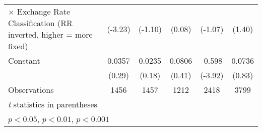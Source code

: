 {\begin{tabular}{l*{5}{c}}
$\times$ Exchange Rate Classification (RR inverted, higher = more fixed)&  (-3.23)         &  (-1.10)         &   (0.08)         &  (-1.07)         &   (1.40)         \\
\addlinespace
Constant        &   0.0357         &   0.0235         &   0.0806         &   -0.598\sym{***}&   0.0736         \\
                &   (0.29)         &   (0.18)         &   (0.41)         &  (-3.92)         &   (0.83)         \\
\midrule
Observations    &     1456         &     1457         &     1212         &     2418         &     3799         \\
\bottomrule
\multicolumn{6}{l}{\footnotesize \textit{t} statistics in parentheses}\\
\multicolumn{6}{l}{\footnotesize \sym{*} \(p<0.05\), \sym{**} \(p<0.01\), \sym{***} \(p<0.001\)}\\
\end{tabular}
}
